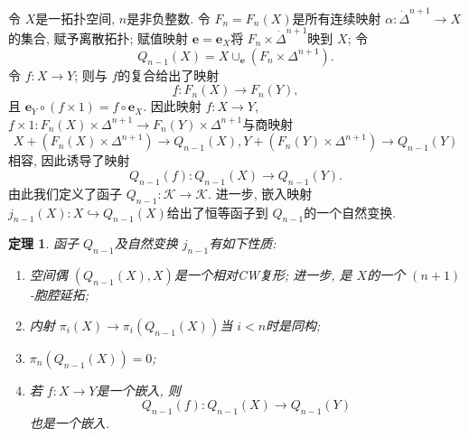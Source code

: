 \documentclass{ctexart}
\theoremstyle{plain}
\newtheorem{theorem}{定理}[section]
\theoremstyle{definition}
\begin{document}
        令 $X$是一拓扑空间, $n$是非负整数. 令 $F_{n}=F_{n}(X)$是所有连续映射 $\alpha:\dot{\Delta}^{n+1}\to X$的集合, 赋予离散拓扑; 赋值映射 $\mathbf{e}=\mathbf{e}_{X}$将 $F_{n}\times \dot{\Delta}^{n+1}$映到 $X$; 令
        \begin{equation*}
          Q_{n-1}(X)=X\cup _{\mathbf{e}}(F_{n}\times \Delta^{n+1}).
        \end{equation*}
        令 $f:X\to Y$; 则与 $f$的复合给出了映射
        \begin{equation*}
          \underline{f}:F_{n}(X)\to F_{n}(Y),
        \end{equation*}
        且 $\mathbf{e}_{Y}\circ (f\times 1)=f\circ \mathbf{e}_{X}$. 因此映射 $f:X\to Y$, $\underline{f}\times 1:F_{n}(X)\times \Delta^{n+1}\to F_{n}(Y)\times \Delta^{n+1}$与商映射
        \begin{equation*}
          X+ (F_{n}(X)\times \Delta^{n+1})\to Q_{n-1}(X),
          Y+ (F_{n}(Y)\times \Delta^{n+1})\to Q_{n-1}(Y)
        \end{equation*}
        相容, 因此诱导了映射 
        \begin{equation*}
          Q_{n-1}(f):Q_{n-1}(X)\to Q_{n-1}(Y).
        \end{equation*}
        由此我们定义了函子 $Q_{n-1}:\mathcal{K}\to \mathcal{K}$. 进一步, 嵌入映射 $j_{n-1}(X):X\hookrightarrow Q_{n-1}(X)$给出了恒等函子到 $Q_{n-1}$的一个自然变换.

        \begin{theorem}
            函子 $Q_{n-1}$及自然变换 $j_{n-1}$有如下性质:
            \begin{enumerate}
                \item 空间偶 $(Q_{n-1}(X),X)$是一个相对CW复形; 进一步, 是 $X$的一个 $(n+1)$-胞腔延拓;
                \item 内射 $\pi_{i}(X)\to \pi_{i}(Q_{n-1}(X))$当 $i<n$时是同构;
                \item $\pi_{n}(Q_{n-1}(X))=0$;
                \item 若 $f:X\to Y$是一个嵌入, 则
                \begin{equation*}
                  Q_{n-1}(f):Q_{n-1}(X)\to Q_{n-1}(Y)
                \end{equation*}
                也是一个嵌入.
            \end{enumerate}
        \end{theorem}
\end{document}
